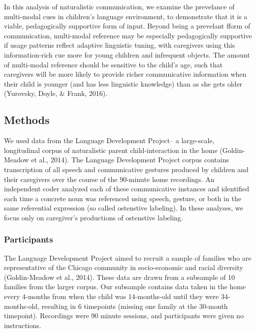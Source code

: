 \documentclass[english,,man,floatsintext]{apa6}
\begin{document}
In this analysis of naturalistic communication, we examine the prevelance of multi-modal cues in children's language environment, to demonstrate that it is a viable, pedagogically supportive form of input. Beyond being a prevelant fform of communication, multi-modal reference may be especially pedagogically supportive if usage patterns reflect adaptive linguistic tuning, with caregivers using this information-rich cue more for young children and infrequent objects. The amount of multi-modal reference should be sensitive to the child's age, such that caregivers will be more likely to provide richer communicative information when their child is younger (and has less linguistic knowledge) than as she gets older (Yurovsky, Doyle, \& Frank, 2016).

\hypertarget{methods}{%
\subsection{Methods}\label{methods}}

We used data from the Language Development Project-- a large-scale, longitudinal corpus of naturalistic parent child-interaction in the home (Goldin-Meadow et al., 2014). The Language Development Project corpus contains transcription of all speech and communicative gestures produced by children and their caregivers over the course of the 90-minute home recordings. An independent coder analyzed each of these communicative instances and identified each time a concrete noun was referenced using speech, gesture, or both in the same referential expression (so called ostenstive labeling). In these analyses, we focus only on caregiver's productions of ostenstive labeling.

\hypertarget{participants}{%
\subsubsection{Participants}\label{participants}}

The Language Development Project aimed to recruit a sample of families who are representative of the Chicago community in socio-economic and racial diversity (Goldin-Meadow et al., 2014). These data are drawn from a subsample of 10 families from the larger corpus. Our subsample contains data taken in the home every 4-months from when the child was 14-months-old until they were 34-months-old, resulting in 6 timepoints (missing one family at the 30-month timepoint). Recordings were 90 minute sessions, and participants were given no instructions.
\end{document}
